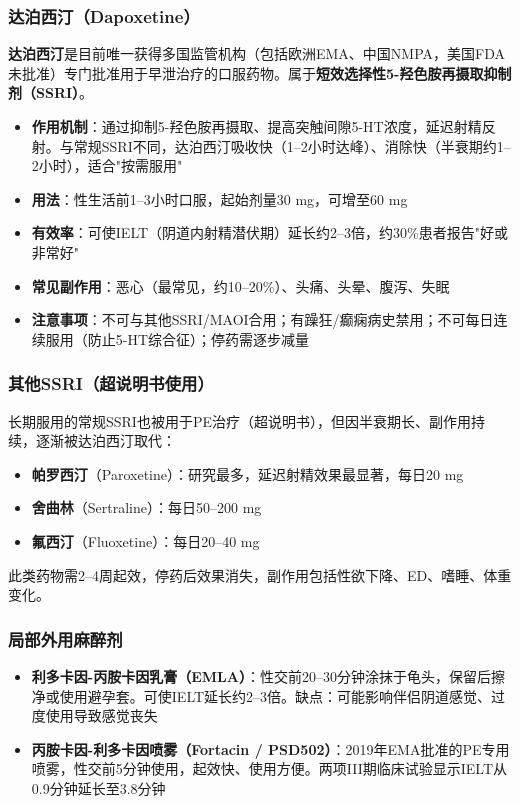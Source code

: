 \subsubsection{达泊西汀（Dapoxetine）}

\textbf{达泊西汀}是目前唯一获得多国监管机构（包括欧洲EMA、中国NMPA，美国FDA未批准）专门批准用于早泄治疗的口服药物。属于\textbf{短效选择性5-羟色胺再摄取抑制剂（SSRI）}。

\begin{itemize}[leftmargin=2cm]
	\item \textbf{作用机制}：通过抑制5-羟色胺再摄取、提高突触间隙5-HT浓度，延迟射精反射。与常规SSRI不同，达泊西汀吸收快（1--2小时达峰）、消除快（半衰期约1--2小时），适合"按需服用"
	\item \textbf{用法}：性生活前1--3小时口服，起始剂量30 mg，可增至60 mg
	\item \textbf{有效率}：可使IELT（阴道内射精潜伏期）延长约2--3倍，约30\%患者报告"好或非常好"
	\item \textbf{常见副作用}：恶心（最常见，约10--20\%）、头痛、头晕、腹泻、失眠
	\item \textbf{注意事项}：不可与其他SSRI/MAOI合用；有躁狂/癫痫病史禁用；不可每日连续服用（防止5-HT综合征）；停药需逐步减量
\end{itemize}

\subsubsection{其他SSRI（超说明书使用）}

长期服用的常规SSRI也被用于PE治疗（超说明书），但因半衰期长、副作用持续，逐渐被达泊西汀取代：
\begin{itemize}[leftmargin=2cm]
	\item \textbf{帕罗西汀}（Paroxetine）：研究最多，延迟射精效果最显著，每日20 mg
	\item \textbf{舍曲林}（Sertraline）：每日50--200 mg
	\item \textbf{氟西汀}（Fluoxetine）：每日20--40 mg
\end{itemize}
此类药物需2--4周起效，停药后效果消失，副作用包括性欲下降、ED、嗜睡、体重变化。

\subsubsection{局部外用麻醉剂}

\begin{itemize}[leftmargin=2cm]
	\item \textbf{利多卡因-丙胺卡因乳膏（EMLA）}：性交前20--30分钟涂抹于龟头，保留后擦净或使用避孕套。可使IELT延长约2--3倍。缺点：可能影响伴侣阴道感觉、过度使用导致感觉丧失
	\item \textbf{丙胺卡因-利多卡因喷雾（Fortacin / PSD502）}：2019年EMA批准的PE专用喷雾，性交前5分钟使用，起效快、使用方便。两项III期临床试验显示IELT从0.9分钟延长至3.8分钟
\end{itemize}

